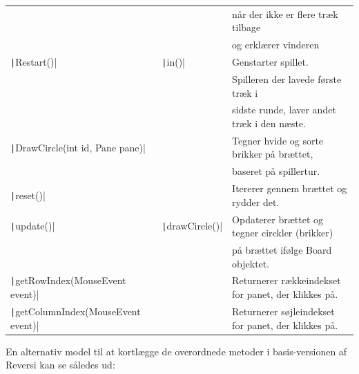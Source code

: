 \begin{table}[H]
\begin{tabular}{lll}
                                                            &                                     & når der ikke er flere træk tilbage                  \\
                                                            &                                     & og erklærer vinderen                                \\
        \texttt|Restart()|                        & \texttt|in()|             & Genstarter spillet.                                 \\
                                                            &                                     & Spilleren der lavede første træk i                  \\
                                                            &                                     & sidste runde, laver andet træk i den næste.         \\
        \texttt|DrawCircle(int id, Pane pane)|    &                                     & Tegner hvide og sorte brikker på brættet,           \\
                                                            &                                     & baseret på spillertur.                              \\
        \texttt|reset()|                          &                                     & Itererer gennem brættet og rydder det.              \\
        \texttt|update()|                         & \texttt|drawCircle()|     & Opdaterer brættet og tegner circkler (brikker)      \\
                                                            &                                     & på brættet ifølge Board objektet.                   \\
        \texttt|getRowIndex(MouseEvent event)|    &                                     & Returnerer rækkeindekset for panet, der klikkes på. \\
        \texttt|getColumnIndex(MouseEvent event)| &                                     & Returnerer søjleindekset for panet, der klikkes på. \\
        \bottomrule
    \end{tabular}
\end{table}
En alternativ model til at kortlægge de overordnede metoder i basis-versionen af Reversi kan se således ud:
